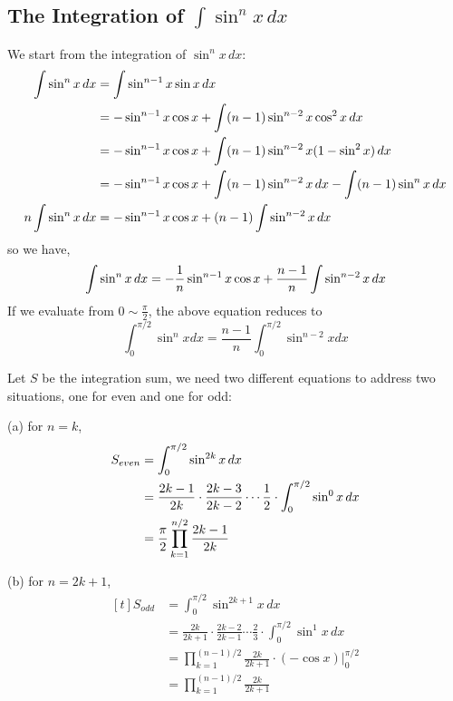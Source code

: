 \documentclass[11pt]{article}
\begin{document}
\subsection{\normalsize The Integration of $ \displaystyle \int \sin ^n x  \, dx$}

We start from the integration of $\sin^n x \, dx$: 
$$
\begin{aligned}[t]
\int \sin ^n x \, dx
    &= \int \sin ^{n-1} x \sin x \, dx\\
    &= - \sin ^{n-1} x \cos x + \int (n-1) \sin ^{n-2} x \cos ^2 x \, dx \\
    &= - \sin ^{n-1} x \cos x + \int (n-1) \sin ^{n-2} x (1 - \sin ^2 x)  \, dx \\
    &= - \sin ^{n-1} x \cos x + \int (n-1) \sin ^{n-2} x \, dx -  \int (n-1)  \sin ^n x \, dx \\
n \int \sin ^n x \, dx &= - \sin ^{n-1} x \cos x + (n-1) \int \sin ^{n-2} x \, dx \\
\end{aligned}\\
$$
so we have, 
$$
\begin{aligned}[t]
\int \sin ^n x \, dx 
	&= - \frac{1}{n} \sin ^{n-1} x \cos x + \frac{n-1}{n} \int \sin ^{n-2} x \, dx \\
\end{aligned}\\
$$
If we evaluate from $\displaystyle 0 \sim \frac{\pi}{2}$,  the above equation reduces to
$$ \int _0 ^{\pi/2} \sin ^n x dx = \frac{n-1}{n} \int _0 ^{\pi/2} \sin ^{n-2} x dx $$

Let $S$ be the integration sum,  we need two different equations to address two situations,  one for even and one for odd:

(a) for $\displaystyle n=k $,
$$
\begin{aligned}[t]
S_{even} 
	&= \int _0 ^{\pi /2} \sin ^{2k} x \, dx \\
	&= \frac{2k-1}{2k} \cdot \frac{2k-3}{2k-2} \cdots \frac{1}{2} \cdot \int _0 ^{\pi/2} \sin ^0 x \, dx \\
	&= \frac{\pi}{2} \prod _{k=1} ^{n/2} \frac{2k-1}{2k} \\
\end{aligned}\\
$$

(b) for $\displaystyle n=2k+1$,  
$$
\begin{aligned}[t]
S_{odd} 
	&= \int _0 ^{\pi /2} \sin ^{2k+1} x \, dx \\
	&= \frac{2k}{2k+1} \cdot \frac{2k-2}{2k-1} \cdots \frac{2}{3} \cdot \int _0 ^{\pi/2} \sin ^1 x \, dx \\
	&= \prod _{k=1} ^{(n-1)/2} \frac{2k}{2k+1} \cdot (-\cos x) \bigg \rvert _0 ^{\pi/2} \\
	&= \prod _{k=1} ^{(n-1)/2} \frac{2k}{2k+1} \\
\end{aligned}
$$
\end{document}
